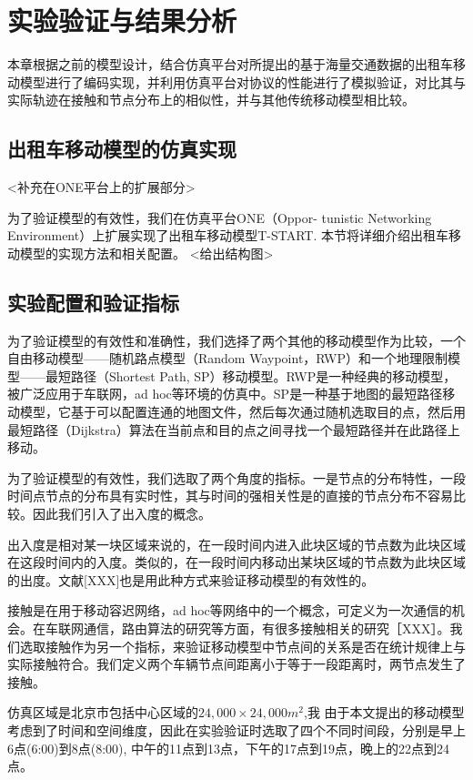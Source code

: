 \chapter{实验验证与结果分析}

本章根据之前的模型设计，结合仿真平台对所提出的基于海量交通数据的出租车移动模型进行了编码实现，并利用仿真平台对协议的性能进行了模拟验证，对比其与实际轨迹在接触和节点分布上的相似性，并与其他传统移动模型相比较。

\section{出租车移动模型的仿真实现}
<补充在ONE平台上的扩展部分>

为了验证模型的有效性，我们在仿真平台ONE（Oppor- tunistic Networking Environment）\cite{KeranenOtt-155}上扩展实现了出租车移动模型T-START. 本节将详细介绍出租车移动模型的实现方法和相关配置。
<给出结构图>



\section{实验配置和验证指标}

为了验证模型的有效性和准确性，我们选择了两个其他的移动模型作为比较，一个自由移动模型——随机路点模型（Random Waypoint，RWP）和一个地理限制模型——最短路径（Shortest Path, SP）移动模型。RWP是一种经典的移动模型，被广泛应用于车联网，ad hoc等环境的仿真中。SP是一种基于地图的最短路径移动模型，它基于可以配置连通的地图文件，然后每次通过随机选取目的点，然后用最短路径（Dijkstra）算法在当前点和目的点之间寻找一个最短路径并在此路径上移动。

为了验证模型的有效性，我们选取了两个角度的指标。一是节点的分布特性，一段时间点节点的分布具有实时性，其与时间的强相关性是的直接的节点分布不容易比较。因此我们引入了出入度的概念。

出入度是相对某一块区域来说的，在一段时间内进入此块区域的节点数为此块区域在这段时间内的入度。类似的，在一段时间内移动出某块区域的节点数为此块区域的出度。文献[XXX]也是用此种方式来验证移动模型的有效性的。

接触是在用于移动容迟网络，ad hoc等网络中的一个概念，可定义为一次通信的机会。在车联网通信，路由算法的研究等方面，有很多接触相关的研究［XXX］。我们选取接触作为另一个指标，来验证移动模型中节点间的关系是否在统计规律上与实际接触符合。我们定义两个车辆节点间距离小于等于一段距离时，两节点发生了接触。

仿真区域是北京市包括中心区域的$24,000\times 24,000m^2$,我
由于本文提出的移动模型考虑到了时间和空间维度，因此在实验验证时选取了四个不同时间段，分别是早上6点(6:00)到8点(8:00), 中午的11点到13点，下午的17点到19点，晚上的22点到24点。

